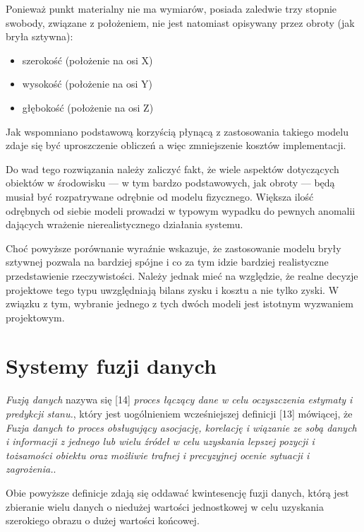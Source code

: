 \par{
Ponieważ punkt materialny nie ma wymiarów, posiada zaledwie trzy stopnie swobody, związane z położeniem, nie jest natomiast opisywany przez obroty (jak bryła sztywna):
\begin{itemize}
\item szerokość (położenie na osi X)
\item wysokość (położenie na osi Y)
\item głębokość (położenie na osi Z)
\end{itemize}
}

\par{
Jak wspomniano podstawową korzyścią płynącą z zastosowania takiego modelu zdaje się być uproszczenie obliczeń a więc zmniejszenie kosztów implementacji.
}
\par{
Do wad tego rozwiązania należy zaliczyć fakt, że wiele aspektów dotyczących obiektów w środowisku --- w tym bardzo podstawowych, jak obroty --- będą musiał być rozpatrywane odrębnie od modelu fizycznego. Większa ilość odrębnych od siebie modeli prowadzi w typowym wypadku do pewnych anomalii dających wrażenie nierealistycznego działania systemu.
}
\par{
Choć powyższe porównanie wyraźnie wskazuje, że zastosowanie modelu bryły sztywnej pozwala na bardziej spójne i co za tym idzie bardziej realistyczne przedstawienie rzeczywistości. Należy jednak mieć na względzie, że realne decyzje projektowe tego typu uwzględniają bilans zysku i kosztu a nie tylko zyski. W związku z tym, wybranie jednego z tych dwóch modeli jest istotnym wyzwaniem projektowym.
}

\section[Systemy fuzji danych][Systemy fuzji danych]{Systemy fuzji danych}
\par{
\textit{Fuzją danych} nazywa się [14] \textit{proces łączący dane w celu oczyszczenia estymaty i predykcji stanu.}, który jest uogólnieniem wcześniejszej definicji [13] mówiącej, że \textit{Fuzja danych to proces obsługujący asocjację, korelację i wiązanie ze sobą danych i informacji z jednego lub wielu źródeł w celu uzyskania lepszej pozycji i tożsamości obiektu oraz możliwie trafnej i precyzyjnej ocenie sytuacji i zagrożenia.}.
}
\par{
Obie powyższe definicje zdają się oddawać kwintesencję fuzji danych, którą jest zbieranie wielu danych o niedużej wartości jednostkowej w celu uzyskania szerokiego obrazu o dużej wartości końcowej.
}

